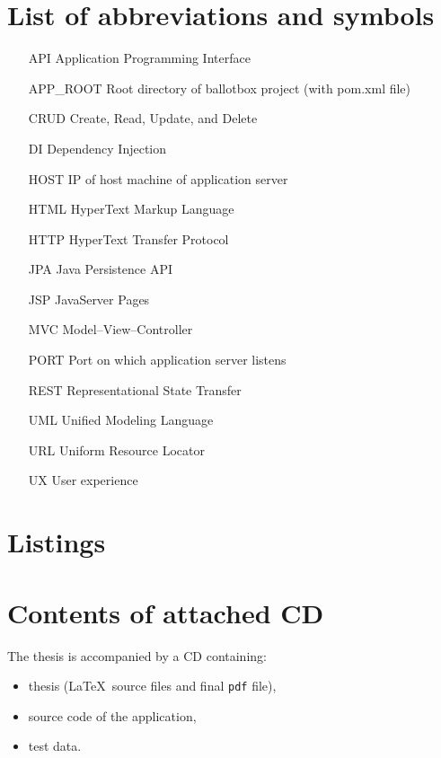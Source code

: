 \documentclass[a4paper,twoside,12pt]{book}
\begin{document}
\pagestyle{onlyPageNumbers}





\begin{appendices} 

\chapter*{List of abbreviations and symbols}

\begin{itemize}
  \item[API] Application Programming Interface
  \item[APP\_ROOT] Root directory of ballotbox project (with pom.xml file)
  \item[CRUD] Create, Read, Update, and Delete 
  \item[DI] Dependency Injection 
  \item[HOST] IP of host machine of application server  
  \item[HTML] HyperText Markup Language
  \item[HTTP] HyperText Transfer Protocol
  \item[JPA] Java Persistence API
  \item[JSP] JavaServer Pages
  \item[MVC] Model--View--Controller
  \item[PORT] Port on which application server listens
  \item[REST] Representational State Transfer
  \item[UML] Unified Modeling Language
  \item[URL] Uniform Resource Locator
  \item[UX] User experience 
\end{itemize}


\chapter*{Listings}

\chapter*{Contents of attached CD}

The thesis is accompanied by a CD containing:
\begin{itemize}
\item thesis (\LaTeX\ source files and final \texttt{pdf} file),
\item source code of the application,
\item test data.
\end{itemize}
 

\listoffigures
\listoftables
	
\end{appendices}
\end{document}
